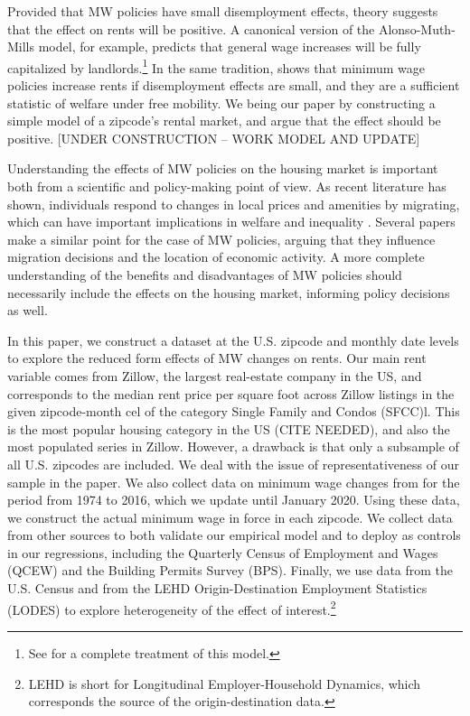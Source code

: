 Provided that MW policies have small disemployment effects, theory suggests that the effect 
on rents will be positive. A canonical version of the Alonso-Muth-Mills model, for example, 
predicts that general wage increases will be fully capitalized by landlords.\footnote{See 
	\textcite{Brueckner1987} for a complete treatment of this model.} 
In the same tradition, \textcite{Yamagishi2020} shows that minimum wage policies increase 
rents if disemployment effects are small, and they are a sufficient statistic of welfare 
under free mobility. We being our paper by constructing a simple model of a zipcode's rental 
market, and argue that the effect should be positive. [UNDER CONSTRUCTION -- WORK MODEL AND 
UPDATE]
 
Understanding the effects of MW policies on the housing market is important both from a 
scientific and policy-making point of view. As recent literature has shown, individuals 
respond to changes in local prices and amenities by migrating, which can have important 
implications in welfare and inequality \parencite{Diamond2016, Couture2019}. Several papers 
make a similar point for the case of MW policies, arguing that they influence migration 
decisions and the location of economic activity\parencite{PerezPerez2018, Monras2019}. A more 
complete understanding of the benefits and disadvantages of MW policies should necessarily 
include the effects on the housing market, informing policy decisions as well.
 
In this paper, we construct a dataset at the U.S. zipcode and monthly date levels to explore the reduced form effects of MW changes on rents. Our main rent variable comes from Zillow, the largest real-estate company in the US, and corresponds to the median rent price per square foot across Zillow listings in the given zipcode-month cel of the category Single Family and Condos (SFCC)l. This is the most popular housing category in the US (CITE NEEDED), and also the most populated series in Zillow. However, a drawback is that only a subsample of all U.S. zipcodes are included. We deal with the issue of representativeness of our sample in the paper. We also collect data on minimum wage changes from \textcite{VaghulZipperer2016} for the period from 1974 to 2016, which we update until January 2020. Using these data, we construct the actual minimum wage in force in each zipcode. We collect data from other sources to both validate our empirical model and to deploy as controls in our regressions, including the Quarterly Census of Employment and Wages (QCEW) and the Building Permits Survey (BPS). Finally, we use data from the U.S. Census and from the  LEHD Origin-Destination Employment Statistics (LODES) to explore heterogeneity of the effect of interest.\footnote{LEHD is short for Longitudinal Employer-Household Dynamics, which corresponds the source of the origin-destination data.}

